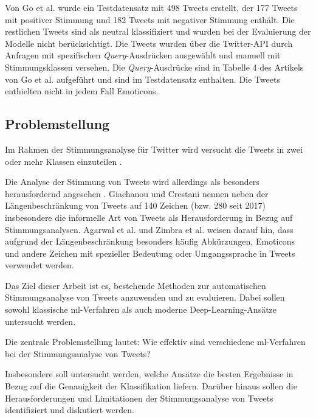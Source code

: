 Von Go et al. \cite{go2009twitter} wurde ein Testdatensatz mit 498 Tweets erstellt, der 177 Tweets mit positiver Stimmung und 182 Tweets mit negativer Stimmung enthält.
Die restlichen Tweets sind als neutral klassifiziert und wurden bei der Evaluierung der Modelle nicht berücksichtigt.
Die Tweets wurden über die Twitter-API durch Anfragen mit spezifischen \textit{Query}-Ausdrücken ausgewählt und manuell mit Stimmungsklassen versehen.
Die \textit{Query}-Ausdrücke sind in Tabelle 4 des Artikels von Go et al. \cite[S. 5]{go2009twitter} aufgeführt und sind im Testdatensatz enthalten.
Die Tweets enthielten nicht in jedem Fall Emoticons.

\subsection{Problemstellung}

Im Rahmen der Stimmungsanalyse für Twitter wird versucht die Tweets in zwei oder mehr Klassen einzuteilen \cite{zimbra2018state}.

Die Analyse der Stimmung von Tweets wird allerdings als besonders herausfordernd angesehen \cite{agarwal2011sentiment, giachanou2016like, zimbra2018state}.
Giachanou und Crestani \cite{giachanou2016like} nennen neben der Längenbeschränkung von Tweets auf 140 Zeichen (bzw. 280 seit 2017) insbesondere die informelle Art von Tweets als Herausforderung in Bezug auf Stimmungsanalysen.
Agarwal et al. \cite{agarwal2011sentiment} und Zimbra et al. \cite{zimbra2018state} weisen darauf hin, dass aufgrund der Längenbeschränkung besonders häufig Abkürzungen, Emoticons und andere Zeichen mit spezieller Bedeutung oder Umgangssprache in Tweets verwendet werden.

Das Ziel dieser Arbeit ist es, bestehende Methoden zur automatischen Stimmungsanalyse von Tweets anzuwenden und zu evaluieren.
Dabei sollen sowohl klassische \gls{ml}-Verfahren als auch moderne Deep-Learning-Ansätze untersucht werden.

Die zentrale Problemstellung lautet: Wie effektiv sind verschiedene \gls{ml}-Verfahren bei der Stimmungsanalyse von Tweets?

Insbesondere soll untersucht werden, welche Ansätze die besten Ergebnisse in Bezug auf die Genauigkeit der Klassifikation liefern.
Darüber hinaus sollen die Herausforderungen und Limitationen der Stimmungsanalyse von Tweets identifiziert und diskutiert werden.
